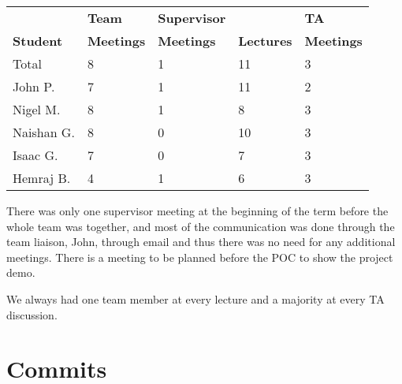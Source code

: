 \documentclass{article}
\begin{document}

\begin{table}[H]
\centering
\begin{tabular}{lllll}
\toprule
\textbf{ } & \textbf{Team} & \textbf{Supervisor} & \textbf{ } & \textbf{TA}\\
\textbf{Student} & \textbf{Meetings} & \textbf{Meetings} & \textbf{Lectures} & \textbf{Meetings}\\
\midrule
Total & 8 & 1 & 11 & 3\\
\midrule
John P. & 7 & 1 & 11 & 2\\
Nigel M. & 8 & 1 & 8 & 3\\
Naishan G. & 8 & 0 & 10 & 3\\
Isaac G. & 7 & 0 & 7 & 3\\
Hemraj B. & 4 & 1 & 6 & 3\\
\bottomrule
\end{tabular}
\end{table}


There was only one supervisor meeting at the beginning of the term before the whole team was together, and most of the communication was done through the team liaison, John, through email and thus there was no need for any additional meetings.
There is a meeting to be planned before the POC to show the project demo.

We always had one team member at every lecture and a majority at every TA discussion.


\section{Commits}



\end{document}
